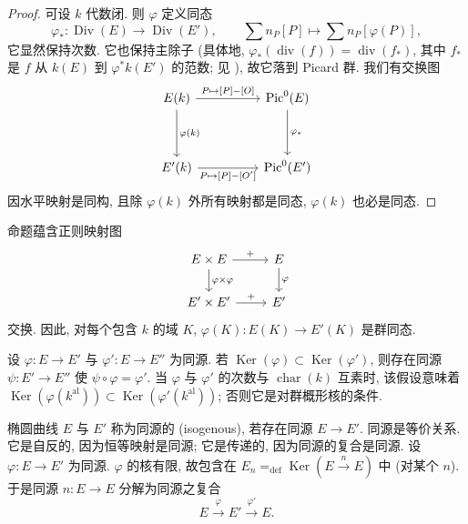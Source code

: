 \begin{proof}
可设 $k$ 代数闭. 则 $\varphi$ 定义同态
\[
\varphi_*\colon\operatorname{Div}(E)\to\operatorname{Div}(E'), \qquad \sum n_P[P]\mapsto\sum n_P[\varphi(P)],
\]
它显然保持次数. 它也保持主除子 (具体地, $\varphi_*(\operatorname{div}(f)) = \operatorname{div}(f_*)$, 其中 $f_*$ 是 $f$ 从 $k(E)$ 到 $\varphi^*k(E')$ 的范数; 见 \cite[4.1(c)]{milne-ant}), 故它落到 Picard 群. 我们有交换图
\[\begin{tikzcd}
	{E(k)} && {\operatorname{Pic}^0(E)} \\
	\\
	{E'(k)} && {\operatorname{Pic}^0(E')}
	\arrow["{P\mapsto [P]-[O]}", from=1-1, to=1-3]
	\arrow["{\varphi(k)}", from=1-1, to=3-1]
	\arrow["{\varphi_\ast}", from=1-3, to=3-3]
	\arrow["{P\mapsto [P]-[O']}"', from=3-1, to=3-3]
\end{tikzcd}\]
因水平映射是同构, 且除 $\varphi(k)$ 外所有映射都是同态, $\varphi(k)$ 也必是同态.
\end{proof}

\begin{aside} \label{thm:2.1.6} 
命题蕴含正则映射图
\[\begin{tikzcd}
	{E\times E} & E \\
	{E'\times E'} & {E'}
	\arrow["{+}", from=1-1, to=1-2]
	\arrow["{\varphi\times\varphi}", from=1-1, to=2-1]
	\arrow["\varphi", from=1-2, to=2-2]
	\arrow["{+}", from=2-1, to=2-2]
\end{tikzcd}\]
交换. 因此, 对每个包含 $k$ 的域 $K$, $\varphi(K)\colon E(K)\to E'(K)$ 是群同态.
\end{aside}

\begin{aside} \label{thm:2.1.7} 
设 $\varphi\colon E\to E'$ 与 $\varphi'\colon E\to E''$ 为同源. 若 $\operatorname{Ker}(\varphi)\subset\operatorname{Ker}(\varphi')$, 则存在同源 $\psi\colon E'\to E''$ 使 $\psi\circ\varphi = \varphi'$. 当 $\varphi$ 与 $\varphi'$ 的次数与 $\operatorname{char}(k)$ 互素时, 该假设意味着 $\operatorname{Ker}(\varphi(k^{\mathrm{al}}))\subset\operatorname{Ker}(\varphi'(k^{\mathrm{al}}))$; 否则它是对群概形核的条件.
\end{aside}

\begin{aside} \label{thm:2.1.8} 
椭圆曲线 $E$ 与 $E'$ 称为同源的 (isogenous), 若存在同源 $E\to E'$. 同源是等价关系. 它是自反的, 因为恒等映射是同源; 它是传递的, 因为同源的复合是同源. 设 $\varphi\colon E\to E'$ 为同源. $\varphi$ 的核有限, 故包含在 $E_n \mathrel{=_{\mathrm{def}}} \operatorname{Ker}(E\xrightarrow{n}E)$ 中 (对某个 $n$). 于是同源 $n\colon E\to E$ 分解为同源之复合
\[
E\xrightarrow{\varphi}E'\xrightarrow{\varphi'}E.
\]
\end{aside}

